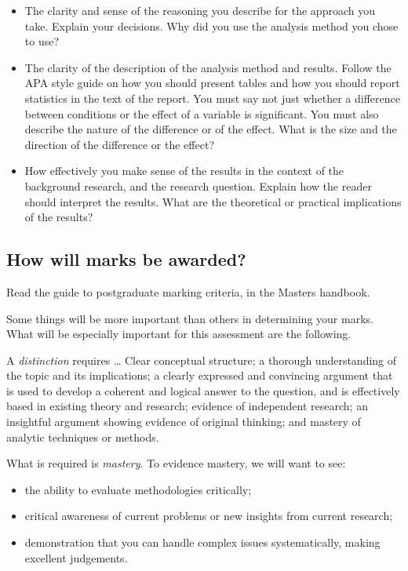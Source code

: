 \documentclass[
  letterpaper,
  DIV=11,
  numbers=noendperiod]{scrreprt}
\providecommand{\tightlist}{%
  \setlength{\itemsep}{0pt}\setlength{\parskip}{0pt}}\usepackage{longtable,booktabs,array}
\begin{document}
\begin{itemize}
\item
  The clarity and sense of the reasoning you describe for the approach
  you take. Explain your decisions. Why did you use the analysis method
  you chose to use?
\item
  The clarity of the description of the analysis method and results.
  Follow the APA style guide on how you should present tables and how
  you should report statistics in the text of the report. You must say
  not just whether a difference between conditions or the effect of a
  variable is significant. You must also describe the nature of the
  difference or of the effect. What is the size and the direction of the
  difference or the effect?
\item
  How effectively you make sense of the results in the context of the
  background research, and the research question. Explain how the reader
  should interpret the results. What are the theoretical or practical
  implications of the results?
\end{itemize}

\hypertarget{sec-marking-how}{%
\subsection{How will marks be awarded?}\label{sec-marking-how}}

Read the guide to postgraduate marking criteria, in the Masters
handbook.

Some things will be more important than others in determining your
marks. What will be especially important for this assessment are the
following.

A \emph{distinction} requires \ldots{} Clear conceptual structure; a
thorough understanding of the topic and its implications; a clearly
expressed and convincing argument that is used to develop a coherent and
logical answer to the question, and is effectively based in existing
theory and research; evidence of independent research; an insightful
argument showing evidence of original thinking; and mastery of analytic
techniques or methods.

What is required is \emph{mastery}. To evidence mastery, we will want to
see:

\begin{itemize}
\tightlist
\item
  the ability to evaluate methodologies critically;
\item
  critical awareness of current problems or new insights from current
  research;
\item
  demonstration that you can handle complex issues systematically,
  making excellent judgements.
\end{itemize}
\end{document}

